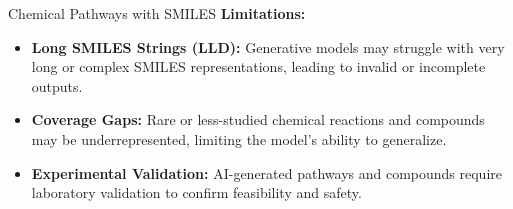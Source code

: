 \begin{frame}[allowframebreaks]{Chemical Pathways with SMILES}
    \framebreak
    \textbf{Limitations:}

    \begin{itemize}
        \item \textbf{Long SMILES Strings (LLD):} Generative models may struggle with very long or complex SMILES representations, leading to invalid or incomplete outputs.
        \item \textbf{Coverage Gaps:} Rare or less-studied chemical reactions and compounds may be underrepresented, limiting the model's ability to generalize.
        \item \textbf{Experimental Validation:} AI-generated pathways and compounds require laboratory validation to confirm feasibility and safety.
    \end{itemize}
\end{frame}